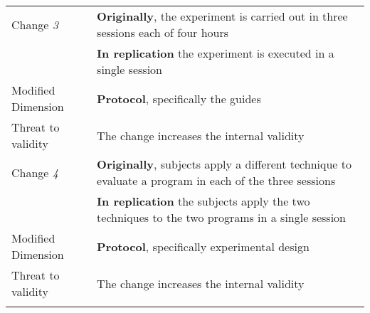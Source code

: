 \begin{table}[h]
\begin{tabularx}{\textwidth}{
  >{\hsize=0.55\hsize}X
  >{\hsize=1.45\hsize}X}
    Change \textit{3}   & \textbf{Originally}, the experiment is carried out in three sessions each of four hours \\& \textbf{In replication} the experiment is executed in a single session  \\  

    Modified Dimension & 
    \textbf{Protocol}, specifically the guides \\  
    Threat to validity  & The change increases the internal validity \\   \hline

    Change \textit{4}   & \textbf{Originally}, subjects apply a different technique to  evaluate a program in each of the three sessions \\& \textbf{In replication} the subjects apply the two techniques to the two programs in a single session \\ 
 
    Modified Dimension & 
    \textbf{Protocol}, specifically experimental design \\   
    Threat to validity  & The change increases the internal validity \\    

	\noalign{\smallskip\smallskip}\hline
	\end{tabularx}  
\end{table}
